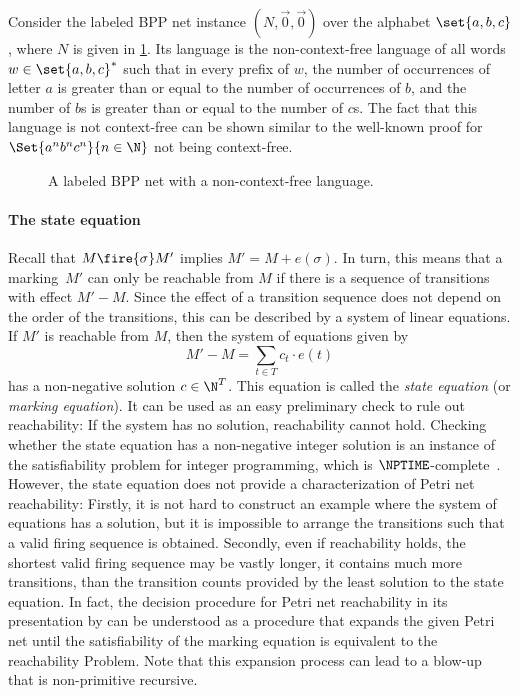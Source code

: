 \documentclass[../../diss.tex]{subfiles}
\begin{document}
\begin{example}%
\label{Example:BPPNonRegular}%
    Consider the labeled BPP net instance $(N,\vec{0},\vec{0})$ over the alphabet $\set{a,b,c}$, where $N$ is given in \cref{Figure:BPPNonRegularExample}.
    Its language is the non-context-free language of all words $w \in \set{a,b,c}^*$ such that in every prefix of $w$, the number of occurrences of letter $a$ is greater than or equal to the number of occurrences of $b$, and the number of $b$s is greater than or equal to the number of $c$s.
    The fact that this language is not context-free can be shown similar to the well-known proof for $\Set{a^n b^n c^n}{n \in \N}$ not being context-free.
\end{example}

\begin{figure}
    \centering%
    \caption{A labeled BPP net with a non-context-free language.}%
    \label{Figure:BPPNonRegularExample}%
\end{figure}

\paragraph{The state equation}

Recall that $M \fire{\sigma} M'$ implies $M' = M + e(\sigma)$.
In turn, this means that a marking~$M'$ can only be reachable from $M$ if there is a sequence of transitions with effect $M' - M$.
Since the effect of a transition sequence does not depend on the order of the transitions, this can be described by a system of linear equations.
If $M'$ is reachable from $M$, then the system of equations given by
\[
   M' - M = \sum_{t \in T} c_t \cdot e(t)
\]
has a non-negative solution $c \in \N^T$.
This equation is called the \emph{state equation} (or \emph{marking equation}).
It can be used as an easy preliminary check to rule out reachability: If the system has no solution, reachability cannot hold.
Checking whether the state equation has a non-negative integer solution is an instance of the satisfiability problem for integer programming, which is $\NPTIME$-complete~\cite{Karp72,BoroshT76}.
However, the state equation does not provide a characterization of Petri net reachability:
Firstly, it is not hard to construct an example where the system of equations has a solution, but it is impossible to arrange the transitions such that a valid firing sequence is obtained.
Secondly, even if reachability holds, the shortest valid firing sequence may be vastly longer, \ie it contains much more transitions, than the transition counts provided by the least solution to the state equation.
In fact, the decision procedure for Petri net reachability in its presentation by  can be understood as a procedure that expands the given Petri net until the satisfiability of the marking equation is equivalent to the reachability Problem.
Note that this expansion process can lead to a blow-up that is non-primitive recursive.
\end{document}
